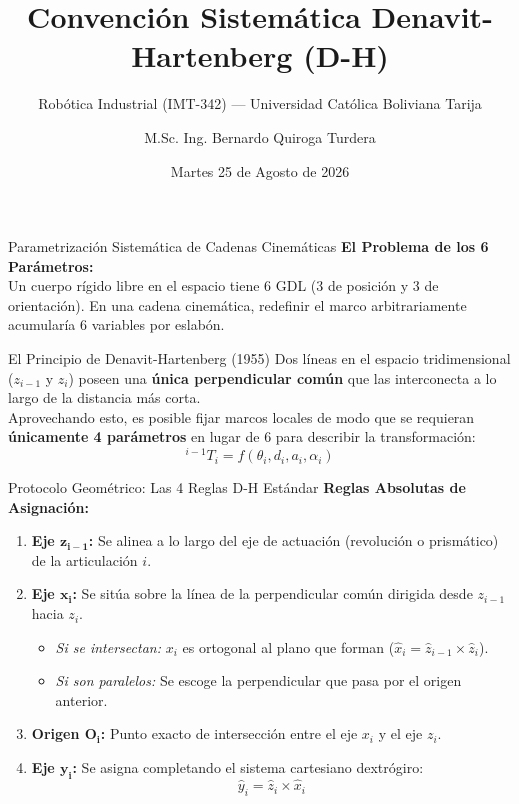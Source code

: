 \documentclass[aspectratio=169]{beamer}
\title[Convención D-H Estándar]{Convención Sistemática Denavit-Hartenberg (D-H)}
\subtitle{Robótica Industrial (IMT-342) — Universidad Católica Boliviana Tarija}
\author[B. Quiroga Turdera]{M.Sc. Ing. Bernardo Quiroga Turdera}
\date{Martes 25 de Agosto de 2026}
\begin{document}
\begin{frame}
    \titlepage
\end{frame}

\begin{frame}{Parametrización Sistemática de Cadenas Cinemáticas}
    \textbf{El Problema de los 6 Parámetros:} \\
    Un cuerpo rígido libre en el espacio tiene 6 GDL (3 de posición y 3 de orientación). En una cadena cinemática, redefinir el marco arbitrariamente acumularía 6 variables por eslabón.
    
    \vspace{0.4cm}
    \begin{block}{El Principio de Denavit-Hartenberg (1955)}
        Dos líneas en el espacio tridimensional ($z_{i-1}$ y $z_i$) poseen una \textbf{única perpendicular común} que las interconecta a lo largo de la distancia más corta. \\
        Aprovechando esto, es posible fijar marcos locales de modo que se requieran \textbf{únicamente 4 parámetros} en lugar de 6 para describir la transformación:
        \begin{equation*}
            ^{i-1}T_i = f(\theta_i, d_i, a_i, \alpha_i)
        \end{equation*}
    \end{block}
\end{frame}

\begin{frame}{Protocolo Geométrico: Las 4 Reglas D-H Estándar}
    \textbf{Reglas Absolutas de Asignación:}
    \begin{enumerate}
        \item \textbf{Eje $\boldsymbol{z_{i-1}}$:} Se alinea a lo largo del eje de actuación (revolución o prismático) de la articulación $i$.
        \item \textbf{Eje $\boldsymbol{x_i}$:} Se sitúa sobre la línea de la perpendicular común dirigida desde $z_{i-1}$ hacia $z_i$.
        \begin{itemize}
            \item \textit{Si se intersectan:} $x_i$ es ortogonal al plano que forman ($\hat{x}_i = \hat{z}_{i-1} \times \hat{z}_i$).
            \item \textit{Si son paralelos:} Se escoge la perpendicular que pasa por el origen anterior.
        \end{itemize}
        \item \textbf{Origen $\boldsymbol{O_i}$:} Punto exacto de intersección entre el eje $x_i$ y el eje $z_i$.
        \item \textbf{Eje $\boldsymbol{y_i}$:} Se asigna completando el sistema cartesiano dextrógiro:
        \begin{equation*}
            \hat{y}_i = \hat{z}_i \times \hat{x}_i
        \end{equation*}
    \end{enumerate}
\end{frame}
\end{document}
